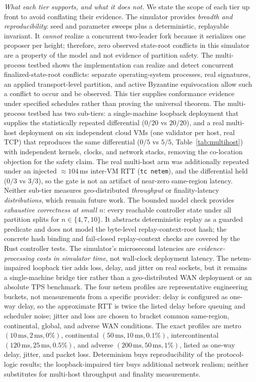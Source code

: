 \documentclass[journal]{IEEEtran}
\theoremstyle{definition}
\theoremstyle{remark}
\begin{document}
\emph{What each tier supports, and what it does not.} We state the scope of each tier up front to
avoid conflating their evidence. The simulator provides \emph{breadth and reproducibility}: seed and
parameter sweeps plus a deterministic, replayable invariant. It \emph{cannot} realize a concurrent
two-leader fork because it serializes one proposer per height; therefore, zero observed state-root
conflicts in this simulator are a property of the model and not evidence of partition safety. The multi-process testbed shows the implementation can realize and detect concurrent
finalized-state-root conflicts: separate operating-system processes, real signatures, an applied
transport-level partition, and active Byzantine equivocation allow such a conflict to occur and be
observed. This tier supplies conformance evidence under specified schedules rather than proving the
universal theorem.
The multi-process testbed has two sub-tiers: a single-machine loopback deployment that supplies the
statistically repeated differential ($0/20$ vs $20/20$), and a real multi-host deployment on six
independent cloud VMs (one validator per host, real TCP) that reproduces the same differential
($0/5$ vs $5/5$, Table~\ref{tab:multihost}) with independent kernels, clocks, and network stacks,
removing the co-location objection for the safety claim. The real multi-host arm was additionally
repeated under an injected $\approx 104$\,ms inter-VM RTT (\texttt{tc netem}), and the differential
held ($0/3$ vs $3/3$), so the gate is not an artifact of near-zero same-region latency. Neither
sub-tier measures geo-distributed \emph{throughput} or finality-latency \emph{distributions}, which
remain future work.
The bounded model check provides \emph{exhaustive correctness at small $n$}: every reachable
controller state under all partition splits for $n\in\{4,7,10\}$. It abstracts deterministic replay
as a guarded predicate and does not model the byte-level replay-context-root hash; the concrete
hash binding and fail-closed replay-context checks are covered by the Rust controller tests. The
simulator's microsecond latencies are \emph{evidence-processing costs in simulator time}, not
wall-clock deployment latency. The netem-impaired loopback tier adds loss, delay, and jitter on
real sockets, but it remains a single-machine bridge tier rather than a geo-distributed WAN
deployment or an absolute TPS benchmark. The four netem profiles are representative engineering
buckets, not measurements from a specific provider: delay is configured as one-way delay, so the
approximate RTT is twice the listed delay before queuing and scheduler noise; jitter and loss are
chosen to bracket common same-region, continental, global, and adverse WAN conditions. The exact
profiles are metro $(10\,\mathrm{ms},2\,\mathrm{ms},0\%)$, continental
$(50\,\mathrm{ms},10\,\mathrm{ms},0.1\%)$, intercontinental
$(120\,\mathrm{ms},25\,\mathrm{ms},0.5\%)$, and adverse
$(200\,\mathrm{ms},50\,\mathrm{ms},1\%)$, listed as one-way delay, jitter, and packet loss.
Determinism buys reproducibility of the protocol-logic results; the loopback-impaired tier buys
additional network realism; neither substitutes for multi-host throughput and finality
measurements.
\end{document}
